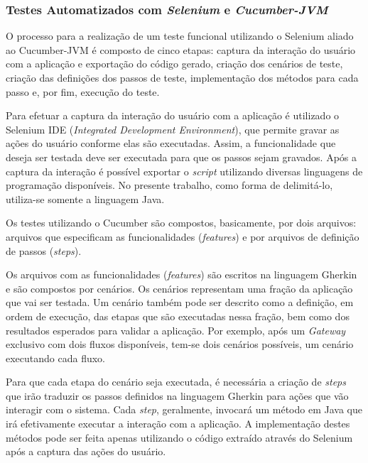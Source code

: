\documentclass[12pt]{article}
\begin{document}
\subsubsection{Testes Automatizados com \emph{Selenium} e \emph{Cucumber-JVM}}

O processo para a realização de um teste funcional utilizando o Selenium aliado ao Cucumber-JVM é composto de cinco etapas: captura da interação do usuário com a aplicação e exportação do código gerado, criação dos cenários de teste, criação das definições dos passos de teste, implementação dos métodos para cada passo e, por fim, execução do teste.

Para efetuar a captura da interação do usuário com a aplicação é utilizado o Selenium IDE (\emph{Integrated Development Environment}), que permite gravar as ações do usuário conforme elas são executadas. Assim, a funcionalidade que deseja ser testada deve ser executada para que os passos sejam gravados. Após a captura da interação é possível exportar o \emph{script} utilizando diversas linguagens de programação disponíveis. No presente trabalho, como forma de delimitá-lo, utiliza-se somente a linguagem Java.

Os testes utilizando o Cucumber são compostos, basicamente, por dois arquivos: arquivos que especificam as funcionalidades (\emph{features}) e por arquivos de definição de passos (\emph{steps}). 

Os arquivos com as funcionalidades (\emph{features}) são escritos na linguagem Gherkin~\cite{gherkin} e são compostos por cenários. Os cenários representam uma fração da aplicação que vai ser testada. Um cenário também pode ser descrito como a definição, em ordem de execução, das etapas que são executadas nessa fração, bem como dos resultados esperados para validar a aplicação. Por exemplo, após um \emph{Gateway} exclusivo com dois fluxos disponíveis, tem-se dois cenários possíveis, um cenário executando cada fluxo. 

Para que cada etapa do cenário seja executada, é necessária a criação de \emph{steps} que irão traduzir os passos definidos na linguagem Gherkin para ações que vão interagir com o sistema. Cada \emph{step}, geralmente, invocará um método em Java que irá efetivamente executar a interação com a aplicação. A implementação destes métodos pode ser feita apenas utilizando o código extraído através do Selenium após a captura das ações do usuário.
\end{document}
